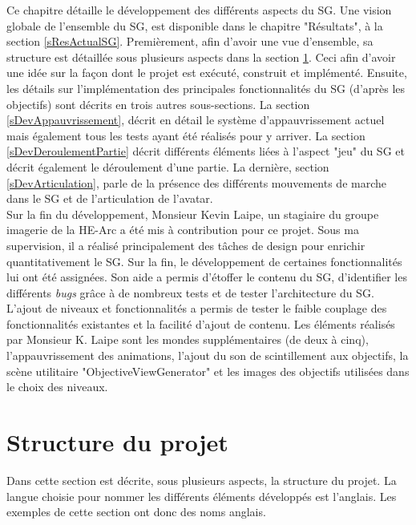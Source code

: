 Ce chapitre détaille le développement des différents aspects du SG. Une vision globale de l'ensemble du SG, est disponible dans le chapitre "Résultats", à la section \ref{sResActualSG}.  Premièrement, afin d'avoir une vue d'ensemble, sa structure est détaillée sous plusieurs aspects dans la section \ref{sDevStructure}. Ceci afin d'avoir une idée sur la façon dont le projet est exécuté, construit et implémenté. Ensuite, les détails sur l'implémentation des principales fonctionnalités du SG (d'après les objectifs) sont décrits en trois autres sous-sections. La section \ref{sDevAppauvrissement}, décrit en détail le système d'appauvrissement actuel mais également tous les tests ayant été réalisés pour y arriver. La section \ref{sDevDeroulementPartie} décrit différents éléments liées à l'aspect "jeu" du SG et décrit également le déroulement d'une partie. La dernière, section \ref{sDevArticulation}, parle de la présence des différents mouvements de marche dans le SG et de l'articulation de l'avatar.
\\

Sur la fin du développement, Monsieur Kevin Laipe, un stagiaire du groupe imagerie de la HE-Arc a été mis à contribution pour ce projet. Sous ma supervision, il a réalisé principalement des tâches de design pour enrichir quantitativement le SG. Sur la fin, le développement de certaines fonctionnalités lui ont été assignées. Son aide a permis d'étoffer le contenu du SG, d'identifier les différents \textit{bugs} grâce à de nombreux tests et de tester l'architecture du SG. L'ajout de niveaux et fonctionnalités a permis de tester le faible couplage des fonctionnalités existantes et la facilité d'ajout de contenu. Les éléments réalisés par Monsieur K. Laipe sont les mondes supplémentaires (de deux à cinq), l'appauvrissement des animations, l'ajout du son de scintillement aux objectifs, la scène utilitaire "ObjectiveViewGenerator" et les images des objectifs utilisées dans le choix des niveaux.%

\section{Structure du projet}
	\label{sDevStructure}
	Dans cette section est décrite, sous plusieurs aspects, la structure du projet. La langue choisie pour nommer les différents éléments développés est l'anglais. Les exemples de cette section ont donc des noms anglais.
